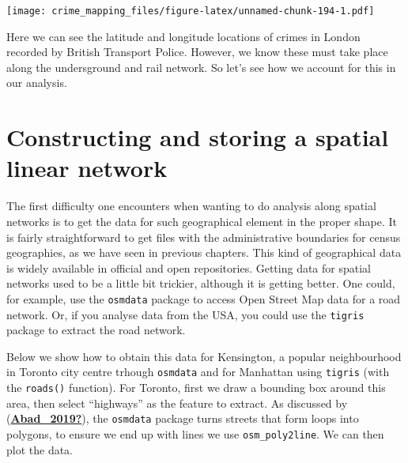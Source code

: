 \documentclass[
  krantz2]{krantz}
\begin{document}
\texttt{[image: crime\_mapping\_files/figure-latex/unnamed-chunk-194-1.pdf]}

Here we can see the latitude and longitude locations of crimes in London recorded by British Transport Police. However, we know these must take place along the undersground and rail network. So let's see how we account for this in our analysis.

\hypertarget{constructing-and-storing-a-spatial-linear-network}{%
\section{Constructing and storing a spatial linear network}\label{constructing-and-storing-a-spatial-linear-network}}

The first difficulty one encounters when wanting to do analysis along spatial networks is to get the data for such geographical element in the proper shape. It is fairly straightforward to get files with the administrative boundaries for census geographies, as we have seen in previous chapters. This kind of geographical data is widely available in official and open repositories. Getting data for spatial networks used to be a little bit trickier, although it is getting better. One could, for example, use the \texttt{osmdata} package to access Open Street Map data for a road network. Or, if you analyse data from the USA, you could use the \texttt{tigris} package to extract the road network.

Below we show how to obtain this data for Kensington, a popular neighbourhood in Toronto city centre trhough \texttt{osmdata} and for Manhattan using \texttt{tigris} (with the \texttt{roads()} function). For Toronto, first we draw a bounding box around this area, then select ``highways'' as the feature to extract. As discussed by (\protect\hyperlink{ref-Abad_2019}{\textbf{Abad\_2019?}}), the \texttt{osmdata} package turns streets that form loops into polygons, to ensure we end up with lines we use \texttt{osm\_poly2line}. We can then plot the data.
\end{document}
